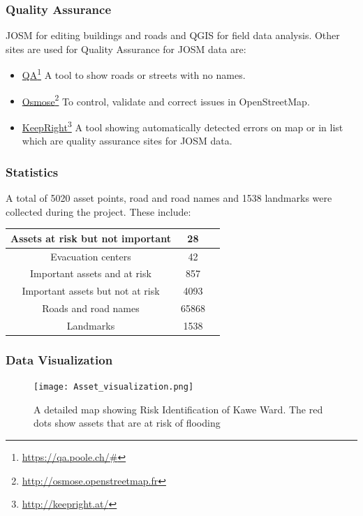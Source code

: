 \documentclass[a4paper,12pt,twoside]{article}
\begin{document}
\subsubsection{Quality Assurance}
JOSM for editing buildings and roads and QGIS for field data analysis. Other sites are used for Quality Assurance for JOSM data are:
\begin{itemize}
    \item \href{https://qa.poole.ch/\#}{QA}\footnote{\url{https://qa.poole.ch/\#}}
    A tool to show roads or streets with no names.

    \item \href{http://osmose.openstreetmap.fr}{Osmose}\footnote{\url{http://osmose.openstreetmap.fr}}
    To  control, validate and correct issues in OpenStreetMap.

    \item \href{http://keepright.at/}{KeepRight}\footnote{\url{http://keepright.at/}}
    A tool showing automatically detected errors on map or in list which are quality assurance sites for JOSM data.

\end{itemize}

\subsubsection{Statistics}
A total of 5020 asset points, road and road names and 1538 landmarks were collected during the project. These include:
\begin{center}
\begin{tabular}{ |c|c|c| }
 \hline
 Assets at risk but not important & 28 \\ 
 \hline
 Evacuation centers & 42 \\ 
 \hline
 Important assets and at risk & 857 \\
 \hline
 Important assets but not at risk & 4093 \\
 \hline
 Roads and road names & 65868 \\
 \hline
 Landmarks & 1538 \\
 \hline 
\end{tabular}
\end{center}

\subsubsection{Data Visualization}
\begin{figure}[h]
{\color{RHgreen}\caption{A detailed map showing Risk Identification of Kawe Ward. The red dots show assets that are at risk of flooding}}
 \centering
 \texttt{[image: Asset\_visualization.png]}
\end{figure}
\end{document}
